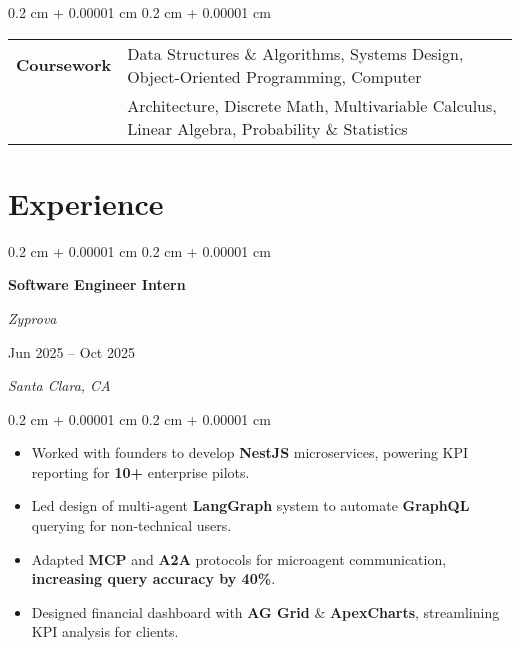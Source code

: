 \documentclass[10pt, letterpaper]{article}
\newenvironment{highlights}{
    \begin{itemize}[
        topsep=0.10 cm,
        parsep=0.10 cm,
        partopsep=0pt,
        itemsep=0pt,
        leftmargin=0.4 cm + 10pt
    ]
}{
    \end{itemize}
} %
\newenvironment{onecolentry}{
    \begin{adjustwidth}{
        0.2 cm + 0.00001 cm
    }{
        0.2 cm + 0.00001 cm
    }
}{
    \end{adjustwidth}
} %
\newenvironment{twocolentry}[2][]{
    \onecolentry
    \def\secondColumn{#2}
    \setcolumnwidth{\fill, 5 cm}
    \begin{paracol}{2}
}{
    \switchcolumn \raggedleft \secondColumn
    \end{paracol}
    \endonecolentry
} %
\let\hrefWithoutArrow\href
\renewcommand{\href}[2]{\hrefWithoutArrow{#1}{\ifthenelse{\equal{#2}{}}{ }{#2 }\raisebox{.15ex}{\footnotesize \faExternalLink*}}}
\begin{document}
        \vspace{0.2 cm}
        \begin{onecolentry}
            \begin{tabularx}{\textwidth}{@{}p{2.15cm}Y@{}}
                \textbf{Coursework} & Data Structures \& Algorithms, Systems Design, Object-Oriented Programming, Computer \\ & Architecture, Discrete Math, Multivariable Calculus, Linear Algebra, Probability \& Statistics \\
            \end{tabularx}
        \end{onecolentry}



    
    \section{Experience}



        
        \begin{twocolentry}{
        Jun 2025 – Oct 2025 
            
        \textit{Santa Clara, CA}}
            \textbf{Software Engineer Intern}
            
            \textit{Zyprova}
        \end{twocolentry}

        \vspace{0.10 cm}
        \begin{onecolentry}
            \begin{highlights}
                \item Worked with founders to develop \textbf{NestJS} microservices, powering KPI reporting for \textbf{10+} enterprise pilots.
                \item Led design of multi-agent \textbf{LangGraph} system to automate \textbf{GraphQL} querying for non-technical users.
                \item Adapted \textbf{MCP} and \textbf{A2A} protocols for microagent communication, \textbf{increasing query accuracy by 40\%}.
                \item Designed financial dashboard with \textbf{AG Grid} \& \textbf{ApexCharts}, streamlining KPI analysis for clients.
            \end{highlights}
        \end{onecolentry}
\end{document}
